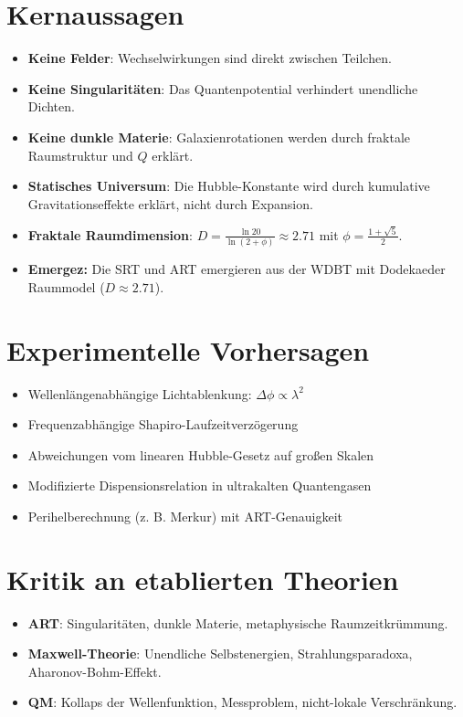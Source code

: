 \documentclass[11pt, a4paper]{article}
\begin{document}
\section*{Kernaussagen}
\begin{itemize}
    \item \textbf{Keine Felder}: Wechselwirkungen sind direkt zwischen Teilchen.
    \item \textbf{Keine Singularitäten}: Das Quantenpotential verhindert unendliche Dichten.
    \item \textbf{Keine dunkle Materie}: Galaxienrotationen werden durch fraktale Raumstruktur und \(Q\) erklärt.
    \item \textbf{Statisches Universum}: Die Hubble-Konstante wird durch kumulative Gravitationseffekte erklärt, nicht durch Expansion.
    \item \textbf{Fraktale Raumdimension}: \( D = \frac{\ln 20}{\ln(2 + \phi)} \approx 2.71 \) mit \(\phi = \frac{1+\sqrt{5}}{2}\).
    \item \textbf{Emergez:} Die SRT und ART emergieren aus der WDBT mit Dodekaeder Raummodel ($D \approx 2.71$).
\end{itemize}

\section*{Experimentelle Vorhersagen}
\begin{itemize}
    \item Wellenlängenabhängige Lichtablenkung: \(\Delta \phi \propto \lambda^2\)
    \item Frequenzabhängige Shapiro-Laufzeitverzögerung
    \item Abweichungen vom linearen Hubble-Gesetz auf großen Skalen
    \item Modifizierte Dispensionsrelation in ultrakalten Quantengasen
    \item Perihelberechnung (z. B. Merkur) mit ART-Genauigkeit
\end{itemize}

\section*{Kritik an etablierten Theorien}
\begin{itemize}
    \item \textbf{ART}: Singularitäten, dunkle Materie, metaphysische Raumzeitkrümmung.
    \item \textbf{Maxwell-Theorie}: Unendliche Selbstenergien, Strahlungsparadoxa, Aharonov-Bohm-Effekt.
    \item \textbf{QM}: Kollaps der Wellenfunktion, Messproblem, nicht-lokale Verschränkung.
\end{itemize}
\end{document}
